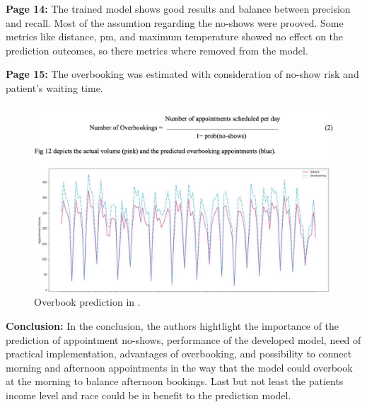     
    \textbf{Page 14:}
    The trained model shows good results and balance between precision and recall. Most of the assumtion regarding the no-shows were prooved. Some metrics like distance, pm, and maximum temperature showed no effect on the prediction outcomes, so there metrics where removed from the model.

    \textbf{Page 15:}
    The overbooking was estimated with consideration of no-show risk and patient's waiting time.
    \begin{figure}[H]
        \centering
        \includegraphics[width=.8\textwidth]{figures/SM0006US23/fig5.png}
        \caption{Overbook prediction in \cite{x147}.}
        \label{fig5:SM0006US23}
    \end{figure}

    \textbf{Conclusion:}
    In the conclusion, the authors hightlight the importance of the prediction of appointment no-shows, performance of the developed model, need of practical implementation, advantages of overbooking, and possibility to connect morning and afternoon appointments in the way that the model could overbook at the morning to balance afternoon bookings. Last but not least the patients income level and race could be in benefit to the prediction model.